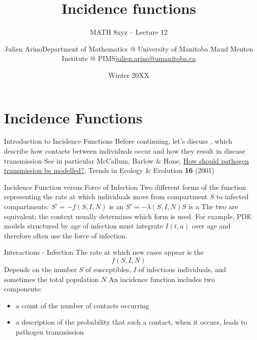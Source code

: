 \documentclass[aspectratio=169]{beamer}\usepackage[]{graphicx}\usepackage[]{xcolor}
\subtitle{MATH 8xyz -- Lecture 12}
\author{\texorpdfstring{Julien Arino\newline Department of Mathematics @ University of Manitoba \newline Maud Menten Institute @ PIMS\newline\url{julien.arino@umanitoba.ca}}{Julien Arino}}
\date{Winter 20XX}
\title{Incidence functions}
\begin{document}


\section{Incidence Functions}

\begin{frame}{Introduction to Incidence Functions}
\bbullet Before continuing, let's discuss , which describe how contacts between individuals occur and how they result in disease transmission
\vfill
\bbullet See in particular McCallum, Barlow \& Hone, \href{https://doi.org/10.1016/S0169-5347(01)02144-9}{How should pathogen transmission be modelled?}, Trends in Ecology \& Evolution \textbf{16} (2001)
\nocite{mccallum2001should}
\end{frame}

\begin{frame}{Incidence Function versus Force of Infection}
\bbullet Two different forms of the function representing the rate at which individuals move from compartment $S$ to infected compartments:
\vfill
\bbullet $S'=-f(S,I,N)$ is an 
\vfill
\bbullet $S'=-\lambda(S,I,N)S$ is a 
\vfill
\bbullet The two are equivalent; the context usually determines which form is used. For example, PDE models structured by age of infection must integrate $I(t,a)$ over age and therefore often use the force of infection.
\end{frame}

\begin{frame}{Interactions - Infection}
\bbullet The rate at which new cases appear is the 
\begin{equation}
\tag{1}
f(S,I,N)
\end{equation}
\bbullet Depends on the number $S$ of susceptibles, $I$ of infectious individuals, and sometimes the total population $N$
\vfill
\bbullet An incidence function includes two components:
\begin{itemize}
  \item a count of the number of contacts occurring
  \item a description of the probability that such a contact, when it occurs, leads to pathogen transmission
\end{itemize}
\end{frame}
\end{document}
